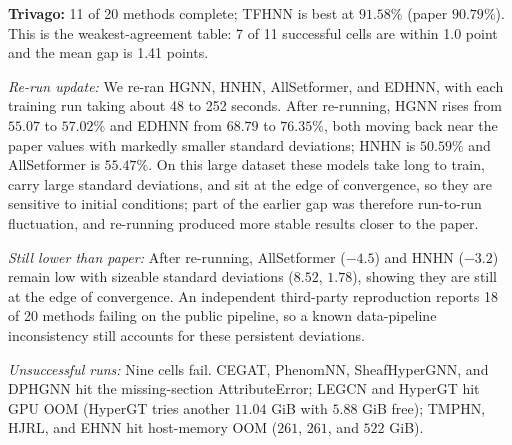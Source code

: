 \documentclass[11pt,a4paper]{article}
\begin{document}
\par\smallskip
\noindent\textbf{Trivago:} 11 of 20 methods complete; TFHNN is best at $91.58\%$ (paper $90.79\%$). This is the weakest-agreement table: 7 of 11 successful cells are within 1.0 point and the mean gap is 1.41 points.

\noindent\textit{Re-run update:} We re-ran HGNN, HNHN, AllSetformer, and EDHNN, with each training run taking about 48 to 252 seconds. After re-running, HGNN rises from $55.07$ to $57.02\%$ and EDHNN from $68.79$ to $76.35\%$, both moving back near the paper values with markedly smaller standard deviations; HNHN is $50.59\%$ and AllSetformer is $55.47\%$. On this large dataset these models take long to train, carry large standard deviations, and sit at the edge of convergence, so they are sensitive to initial conditions; part of the earlier gap was therefore run-to-run fluctuation, and re-running produced more stable results closer to the paper.

\noindent\textit{Still lower than paper:} After re-running, AllSetformer ($-4.5$) and HNHN ($-3.2$) remain low with sizeable standard deviations ($8.52$, $1.78$), showing they are still at the edge of convergence. An independent third-party reproduction reports 18 of 20 methods failing on the public pipeline, so a known data-pipeline inconsistency still accounts for these persistent deviations.

\noindent\textit{Unsuccessful runs:} Nine cells fail. CEGAT, PhenomNN, SheafHyperGNN, and DPHGNN hit the missing-section AttributeError; LEGCN and HyperGT hit GPU OOM (HyperGT tries another $11.04$ GiB with $5.88$ GiB free); TMPHN, HJRL, and EHNN hit host-memory OOM ($261$, $261$, and $522$ GiB).
\end{document}
